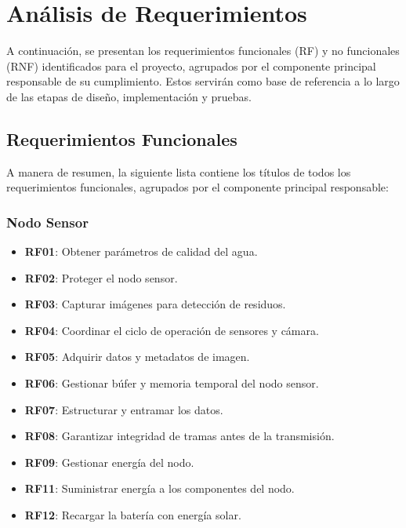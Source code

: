 
\makeatletter
\newcommand{\RF}[1][]{%
  \refstepcounter{RF}%
  RF\@tempcnta=\value{RF}%
  \ifnum\@tempcnta<10 0\fi%
  \arabic{RF}%
  \if\relax#1\relax\else\label{#1}\fi%
}
\makeatother

\makeatletter
\newcommand{\RNF}[1][]{%
  \refstepcounter{RNF}%
  RNF\@tempcnta=\value{RNF}%
  \ifnum\@tempcnta<10 0\fi%
  \arabic{RNF}%
  \if\relax#1\relax\else\label{#1}\fi%
}
\makeatother




\section{Análisis de Requerimientos}
\label{sec:analisis_requerimientos} %

A continuación, se presentan los requerimientos funcionales (RF) y no funcionales (RNF) identificados para el proyecto, agrupados por el componente principal responsable de su cumplimiento. Estos servirán como base de referencia a lo largo de las etapas de diseño, implementación y pruebas.

\subsection{Requerimientos Funcionales}
\label{subsec:rf_summary} %

A manera de resumen, la siguiente lista contiene los títulos de todos los requerimientos funcionales, agrupados por el componente principal responsable:

\subsubsection*{Nodo Sensor}
\begin{itemize}
    \item \textbf{RF01}: Obtener parámetros de calidad del agua.
    \item \textbf{RF02}: Proteger el nodo sensor.
    \item \textbf{RF03}: Capturar imágenes para detección de residuos.
    \item \textbf{RF04}: Coordinar el ciclo de operación de sensores y cámara.
    \item \textbf{RF05}: Adquirir datos y metadatos de imagen.
    \item \textbf{RF06}: Gestionar búfer y memoria temporal del nodo sensor.
    \item \textbf{RF07}: Estructurar y entramar los datos.
    \item \textbf{RF08}: Garantizar integridad de tramas antes de la transmisión.
    \item \textbf{RF09}: Gestionar energía del nodo.
    \item \textbf{RF11}: Suministrar energía a los componentes del nodo.
    \item \textbf{RF12}: Recargar la batería con energía solar.
\end{itemize}

